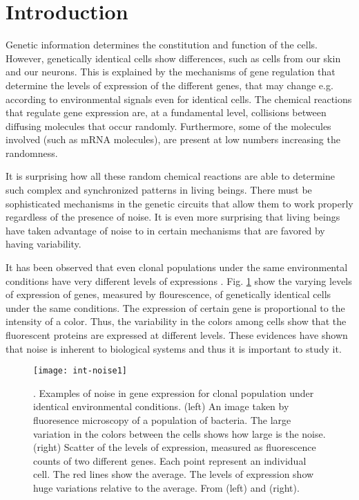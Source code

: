 \chapter*{Introduction}

Genetic information determines the constitution and function of the cells. However, genetically identical cells show differences, such as cells from our skin and our neurons. This is explained by the mechanisms of gene regulation that determine the levels of expression of the different genes, that may change e.g. according to environmental signals even for identical cells. The chemical reactions that regulate gene expression are, at a fundamental level, collisions between diffusing molecules that occur randomly. Furthermore, some of the molecules involved (such as mRNA molecules), are present at low numbers increasing the randomness.

It is surprising how all these random chemical reactions are able to determine such complex and synchronized patterns in living beings. There must be sophisticated mechanisms in the genetic circuits that allow them to work properly regardless of the presence of noise. It is even more surprising that living beings have taken advantage of noise to in certain mechanisms that are favored by having variability.

It has been observed that even clonal populations under the same environmental conditions have very different levels of expressions \cite{elowitz02} \cite{pedraza05}. Fig. \ref{fig:int-noise1} show the varying levels of expression of genes, measured by flourescence, of genetically identical cells under the same conditions. The expression of certain gene is proportional to the intensity of a color. Thus, the variability in the colors among cells show that the fluorescent proteins are expressed at different levels. These evidences have shown that noise is inherent to biological systems and thus it is important to study it.

\begin{figure}[H]
  \centering
  \texttt{[image: int-noise1]}
  \caption[Examples of noise in gene expression]{\label{fig:int-noise1} . Examples of noise in gene expression for clonal population under identical environmental conditions. (left) An image taken by fluoresence microscopy of a population of bacteria. The large variation in the colors between the cells shows how large is the noise. (right) Scatter of the levels of expression, measured as fluorescence counts of two different genes. Each point represent an individual cell. The red lines show the average. The levels of expression show huge variations relative to the average. From \cite{elowitz02} (left) and \cite{pedraza05} (right).}
\end{figure}

